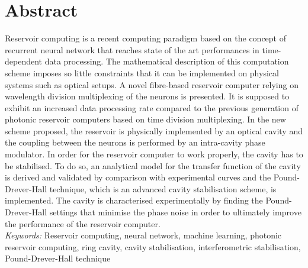 \chapter*{Abstract}

Reservoir computing is a recent computing paradigm based on the concept of recurrent neural network that reaches state of the art performances in time-dependent data processing. The mathematical description of this computation scheme imposes so little constraints that it can be implemented on physical systems such as optical setups. A novel fibre-based reservoir computer relying on wavelength division multiplexing of the neurons is presented. It is supposed to exhibit an increased data processing rate compared to the previous generation of photonic reservoir computers based on time division multiplexing. In the new scheme proposed, the reservoir is physically implemented by an optical cavity and the coupling between the neurons is performed by an intra-cavity phase modulator. In order for the reservoir computer to work properly, the cavity has to be stabilised. To do so, an analytical model for the transfer function of the cavity is derived and validated by comparison with experimental curves and the Pound-Drever-Hall technique, which is an advanced cavity stabilisation scheme, is implemented. The cavity is characterised experimentally by finding the Pound-Drever-Hall settings that minimise the phase noise in order to ultimately improve the performance of the reservoir computer.\\

\textit{Keywords:} Reservoir computing, neural network, machine learning, photonic reservoir computing, ring cavity, cavity stabilisation, interferometric stabilisation, Pound-Drever-Hall technique